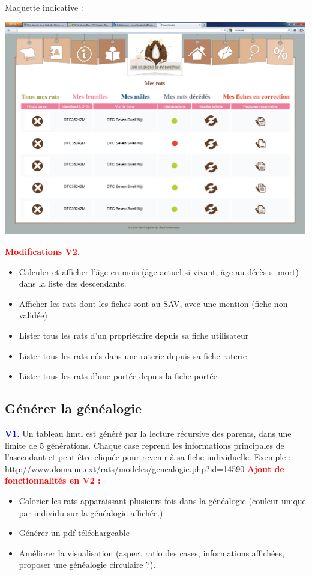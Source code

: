 \documentclass[a4paper,10pt]{article}
\newcommand\existant[1]{\noindent\textbf{\textcolor{blue}{#1}}}
\newcommand\desire[1]{\noindent\textbf{\textcolor{red}{#1}}}
\begin{document}
Maquette indicative :

\begin{center}\includegraphics[width=0.8\linewidth]{DashboardUser.jpg}\end{center}

\desire{Modifications V2.}
\begin{itemize}
\item Calculer et afficher l'âge en mois (âge actuel si vivant, âge au décès si mort) dans la liste des descendants.
\item Afficher les rats dont les fiches sont au SAV, avec une mention (fiche non validée) 
\item Lister tous les rats d'un propriétaire depuis sa fiche utilisateur
\item Lister tous les rats nés dans une raterie depuis sa fiche raterie
\item Lister tous les rats d'une portée depuis la fiche portée
\end{itemize}

\subsection{Générer la généalogie}
\existant{V1.} Un tableau hmtl est généré par la lecture récursive des parents, dans une limite de 5 générations. Chaque case reprend les informations principales de l'ascendant et peut être cliquée pour revenir à sa fiche individuelle. Exemple : \url{http://www.domaine.ext/rats/modeles/genealogie.php?id=14590}
\desire{Ajout de fonctionnalités en V2 :} 
\begin{itemize}
\item Colorier les rats apparaissant plusieurs fois dans la généalogie (couleur unique par individu sur la généalogie affichée.)
\item Générer un pdf téléchargeable
\item Améliorer la visualisation (aspect ratio des cases, informations affichées, proposer une généalogie circulaire ?).
\end{itemize}
\end{document}
